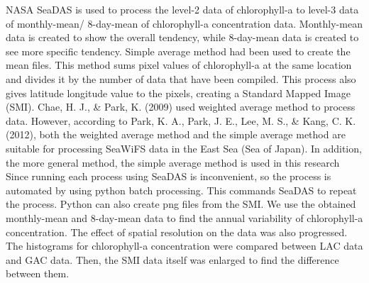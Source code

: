   NASA SeaDAS is used to process the level-2 data of chlorophyll-a to level-3 data of monthly-mean/ 8-day-mean of chlorophyll-a concentration data. Monthly-mean data is created to show the overall tendency, while 8-day-mean data is created to see more specific tendency. Simple average method had been used to create the mean files. This method sums pixel values of chlorophyll-a at the same location and divides it by the number of data that have been compiled. This process also gives latitude longitude value to the pixels, creating a Standard Mapped Image (SMI). Chae, H. J., \& Park, K. (2009) used weighted average method to process data. However, according to Park, K. A., Park, J. E., Lee, M. S., \& Kang, C. K. (2012), both the weighted average method and the simple average method are suitable for processing SeaWiFS data in the East Sea (Sea of Japan). In addition, the more general method, the simple average method is used in this research
 Since running each process using SeaDAS is inconvenient, so the process is automated by using python batch processing. This commands SeaDAS to repeat the process. Python can also create png files from the SMI. We use the obtained monthly-mean and 8-day-mean data to find the annual variability of chlorophyll-a concentration.
 The effect of spatial resolution on the data was also progressed. The histograms for chlorophyll-a concentration were compared between LAC data and GAC data. Then, the SMI data itself was enlarged to find the difference between them.
 
 
 